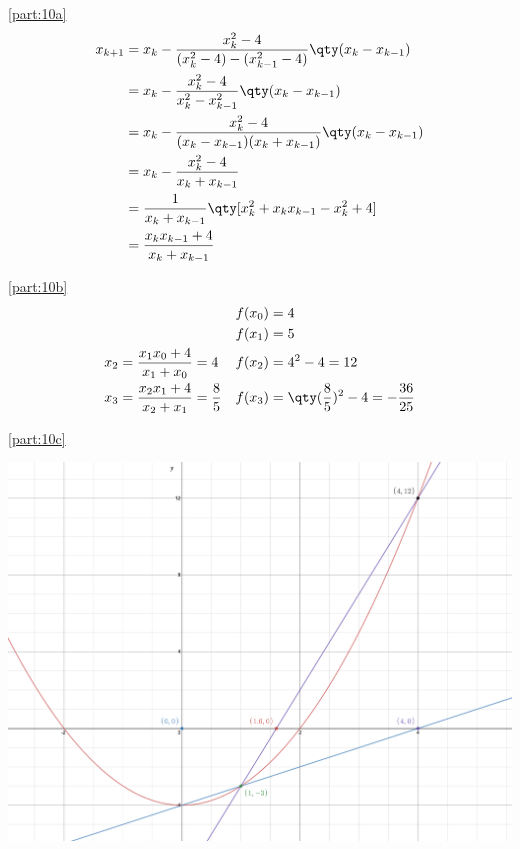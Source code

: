 \documentclass[boxes,pages]{homework}
\begin{document}
\begin{solution}
	\ref{part:10a}
	\begin{align*}
		x_{k+1} & = x_k - \frac{x_k^2 - 4}{(x_k^2 - 4) - (x_{k-1}^2 - 4)}\qty(x_k - x_{k-1})  \\
		        & = x_k - \frac{x_k^2 - 4}{x_k^2 - x_{k-1}^2}\qty(x_k - x_{k-1})              \\
		        & = x_k - \frac{x_k^2 - 4}{(x_k - x_{k-1})(x_k + x_{k-1})}\qty(x_k - x_{k-1}) \\
		        & = x_k - \frac{x_k^2 - 4}{x_k + x_{k-1}}                                     \\
		        & = \frac{1}{x_k + x_{k-1}}\qty[x_k^2 + x_kx_{k-1} - x_k^2 + 4]               \\
		        & = \frac{x_kx_{k-1} + 4}{x_k + x_{k-1}}
	\end{align*}

	\ref{part:10b}
	\begin{align*}
		    &                                              & f(x_0) & = 4                                        \\
		    &                                              & f(x_1) & = 5                                        \\
		x_2 & = \frac{x_1x_0 + 4}{x_1 + x_0} = 4           & f(x_2) & = 4^2 - 4 = 12                             \\
		x_3 & = \frac{x_2x_1 + 4}{x_2 + x_1} = \frac{8}{5} & f(x_3) & = \qty(\frac{8}{5})^2 - 4 = -\frac{36}{25}
	\end{align*}

	\ref{part:10c}
	\begin{center}
		\includegraphics[width=\textwidth]{parab.png}
	\end{center}
\end{solution}
\end{document}
